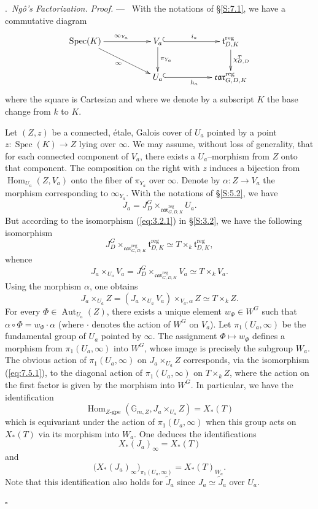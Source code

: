 \documentclass[12pt,a4paper,oneside,english,leqno]{smfart}
\makeatletter
\numberwithin{equation}{subsection}
\numberwithin{theo}{subsection}
\newenvironment{paragr}[1][]{\medskip\refstepcounter{subsection}%
  \par\noindent\hspace*{\parindent}\thesubsection.\ \emph{#1}%
  \@ifundefined{@empty}{}{}\ignorespaces}{\medskip}
\theoremstyle{plain}
\theoremstyle{definition}
\theoremstyle{remark}
\newenvironment{preuve}[1][]{\medskip\noindent\textit{Proof.} #1 ---\ }%
  {\hfill\ensuremath{\square}\medskip}
\DeclareMathOperator{\reg}{reg}
\DeclareMathOperator{\Aut}{Aut}
\DeclareMathOperator{\Hom}{Hom}
\DeclareMathOperator{\Spec}{Spec}
\DeclareMathOperator{\car}{\mathfrak{car}}
\makeatother
\begin{document}
\begin{paragr}[Ng\^o's Factorization.]
\begin{preuve}
With the notations of §\ref{S:7.1}, we have a commutative diagram
$$\xymatrix{
\Spec(K) \ar[rr]^{\infty_{Y_a}} \ar[rrd]_{\infty} &  & V_{a}\ar@{^{(}->}[rr]^{i_a} \ar[d]^{\pi_{Y_a}}&& \mathfrak{t}^{\reg}_{D,K} \ar[d]^{\chi^T_{G,D}}\\
& & U_a\ar@{^{(}->}[rr]_{h_{a}}& &\car^{\reg}_{G,D,K}
}$$
where the square is Cartesian and where we denote by a subscript $K$ the base change from $k$ to $K$.

Let $(Z,z)$ be a connected, étale, Galois cover of $U_a$ pointed by a point $z : \Spec(K)\to Z$ lying over $\infty$. We may assume, without loss of generality, that for each connected component of $V_a$, there exists a $U_a$–morphism from $Z$ onto that component. The composition on the right with $z$ induces a bijection from $\Hom_{U_a}(Z,V_a)$ onto the fiber of $\pi_{Y_a}$ over $\infty$. Denote by $\alpha : Z\to V_a$ the morphism corresponding to $\infty_{Y_a}$. With the notations of §\ref{S:5.2}, we have
$$J_a=J_D^G\times_{\car^{\reg}_{G,D,K}} U_a.$$
But according to the isomorphism (\ref{eq:3.2.1}) in §\ref{S:3.2}, we have the following isomorphism
$$J_D^G \times_{\car^{\reg}_{G,D,K}}\mathfrak{t}^{\reg}_{D,K}\simeq  T \times_k \mathfrak{t}^{\reg}_{D,K},$$
whence
$$J_a\times_{U_a}V_a=J_D^G\times_{\car^{\reg}_{G,D,K}} V_a \simeq  T \times_k V_a.$$
Using the morphism $\alpha$, one obtains
\begin{equation}\label{eq:7.5.1}
  J_a\times_{U_a} Z = (J_a\times_{U_a} V_a)\times_{V_a,\alpha} Z \simeq T \times_k Z.
\end{equation}
For every $\Phi\in \Aut_{U_a}(Z)$, there exists a unique element $w_{\Phi}\in W^G$ such that $\alpha\circ \Phi = w_{\Phi}\cdot\alpha$ (where $\cdot$ denotes the action of $W^G$ on $V_a$). Let $\pi_1(U_a,\infty)$ be the fundamental group of $U_a$ pointed by $\infty$. The assignment $\Phi \mapsto w_{\Phi}$ defines a morphism from $\pi_1(U_a,\infty)$ into $W^G$, whose image is precisely the subgroup $W_a$. The obvious action of $\pi_1(U_a,\infty)$ on $J_a\times_{U_a} Z$ corresponds, via the isomorphism (\ref{eq:7.5.1}), to the diagonal action of $\pi_1(U_a,\infty)$ on $T \times_k Z$, where the action on the first factor is given by the morphism into $W^G$. In particular, we have the identification
$$\Hom_{Z\textrm{-gpe}}( \mathbb{G}_{m,Z},  J_a\times_{U_a} Z)=X_*(T)$$
which is equivariant under the action of $\pi_1(U_a,\infty)$ when this group acts on $X_*(T)$ via its morphism into $W_a$. One deduces the identifications
$$X_*(J_a)_{\infty}=X_*(T)$$
and
\begin{equation}\label{eq:7.5.2}
\bigl(X_*(J_a)_{\infty}\bigr)_{\pi_1(U_a,\infty) }=X_*(T)_{W_a}.
\end{equation}
Note that this identification also holds for $\tilde{J}_a$ since $J_a\simeq \tilde{J}_a$ over $U_a$.


\end{preuve}
\end{paragr}
\end{document}
